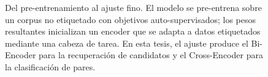\begin{figure}[H]
\caption{Del pre-entrenamiento al ajuste fino. El modelo se pre-entrena sobre un corpus no etiquetado con objetivos auto-supervisados; los pesos resultantes inicializan un encoder que se adapta a datos etiquetados mediante una cabeza de tarea. En esta tesis, el ajuste produce el Bi-Encoder para la recuperación de candidatos y el Cross-Encoder para la clasificación de pares.}
\label{fig:pretraining_finetuning}
\end{figure}
